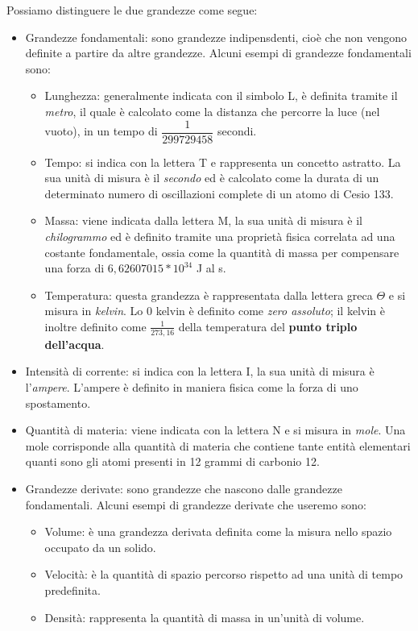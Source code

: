 \documentclass[11pt]{article}
\begin{document}
Possiamo distinguere le due grandezze come segue:
\begin{itemize}
	\item Grandezze fondamentali: sono grandezze indipensdenti, cioè che non vengono definite a partire da altre grandezze. Alcuni esempi di grandezze fondamentali sono:
	\begin{itemize}
		\item Lunghezza: generalmente indicata con il simbolo L, è definita tramite il \textit{metro}, il quale è calcolato come la distanza che percorre la luce (nel vuoto), in un tempo di $\dfrac{1}{299729458}$ secondi.
		\item Tempo: si indica con la lettera T e rappresenta un concetto astratto. La sua unità di misura è il \textit{secondo} ed è calcolato come la durata di un determinato numero di oscillazioni complete di un atomo di Cesio 133.
		\item Massa: viene indicata dalla lettera M, la sua unità di misura è il \textit{chilogrammo} ed è definito tramite una proprietà fisica correlata ad una costante fondamentale, ossia come la quantità di massa per compensare una forza di $6,626 070 15 * 10^34$ J al s. 
		\item Temperatura: questa grandezza è rappresentata dalla lettera greca $\Theta$ e si misura in \textit{kelvin}.  Lo 0 kelvin è definito come \textit{zero assoluto}; il kelvin è inoltre definito come $\frac{1}{273,16}$ della temperatura del \textbf{punto triplo dell'acqua}.
	\end{itemize}
	\item Intensità di corrente: si indica con la lettera I, la sua unità di misura è l'\textit{ampere}. L'ampere è definito in maniera fisica come la forza di uno spostamento.
	\item Quantità di materia: viene indicata con la lettera N e si misura in \textit{mole}. Una mole corrisponde alla quantità di materia che contiene tante entità elementari quanti sono gli atomi presenti in 12 grammi di carbonio 12.
	\item Grandezze derivate: sono grandezze che nascono dalle grandezze fondamentali. Alcuni esempi di grandezze derivate che useremo sono:
	\begin{itemize}
		\item Volume: è una grandezza derivata definita come la misura nello spazio occupato da un solido.
		\item Velocità: è la quantità di spazio percorso rispetto ad una unità di tempo predefinita.
		\item Densità: rappresenta la quantità di massa in un'unità di volume.
	\end{itemize}
\end{itemize}
\end{document}

